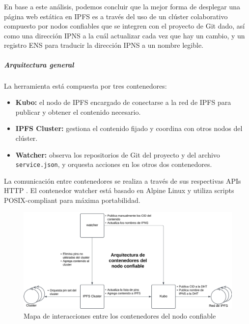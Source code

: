 En base a este análisis, podemos concluir que la mejor forma de desplegar una página web estática en IPFS es a través del uso de un clúster colaborativo compuesto por nodos confiables que se integren con el proyecto de Git dado, así como una dirección IPNS a la cuál actualizar cada vez que hay un cambio, y un registro ENS para traducir la dirección IPNS a un nombre legible.

\subparagraph{Arquitectura general}

La herramienta está compuesta por tres contenedores:
\begin{itemize}
    \item \textbf{Kubo:} el nodo de IPFS encargado de conectarse a la red de IPFS para publicar y obtener el contenido necesario.
    \item \textbf{IPFS Cluster:} gestiona el contenido fijado y coordina con otros nodos del clúster.
    \item \textbf{Watcher:} observa los repositorios de Git del proyecto y del archivo \texttt{service.json}, y orquesta acciones en los otros dos contenedores.
\end{itemize}

La comunicación entre contenedores se realiza a través de sus respectivas APIs HTTP \cite{kubo-api} \cite{cluster-api}. El contenedor watcher está basado en Alpine Linux y utiliza scripts POSIX-compliant para máxima portabilidad.

\begin{figure}[H]
    \centering
    \includegraphics[width=1\linewidth]{img/solucion-ipfs/contenedores-trusted-peer.png}
    \caption{Mapa de interacciones entre los contenedores del nodo confiable}
    \label{fig:contenedores-trusted-peer}
\end{figure}

